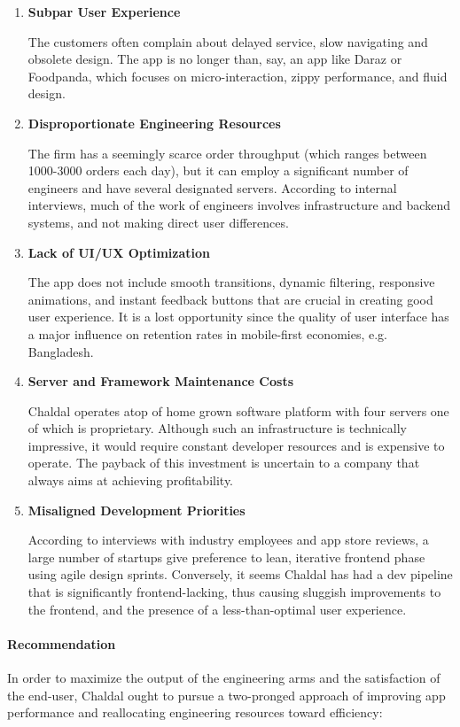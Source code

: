 \documentclass[12pt,a4paper]{article}
\begin{document}
\begin{enumerate}
    \item \textbf{Subpar User Experience}
    
 The customers often complain about delayed service, slow navigating and obsolete design. The app is no longer than, say, an app like Daraz or Foodpanda, which focuses on micro-interaction, zippy performance, and fluid design.    
    \item \textbf{Disproportionate Engineering Resources}
    
 The firm has a seemingly scarce order throughput (which ranges between 1000-3000 orders each day), but it can employ a significant number of engineers and have several designated servers. According to internal interviews, much of the work of engineers involves infrastructure and backend systems, and not making direct user differences.    
    \item \textbf{Lack of UI/UX Optimization}
    
 The app does not include smooth transitions, dynamic filtering, responsive animations, and instant feedback buttons that are crucial in creating good user experience. It is a lost opportunity since the quality of user interface has a major influence on retention rates in mobile-first economies, e.g. Bangladesh.
     \item \textbf{Server and Framework Maintenance Costs}
    
 Chaldal operates atop of home grown software platform with four servers one of which is proprietary. Although such an infrastructure is technically impressive, it would require constant developer resources and is expensive to operate. The payback of this investment is uncertain to a company that always aims at achieving profitability.
     \item \textbf{Misaligned Development Priorities}
    
 According to interviews with industry employees and app store reviews, a large number of startups give preference to lean, iterative frontend phase using agile design sprints. Conversely, it seems Chaldal has had a dev pipeline that is significantly frontend-lacking, thus causing sluggish improvements to the frontend, and the presence of a less-than-optimal user experience.
\end{enumerate}

\paragraph{Recommendation}
In order to maximize the output of the engineering arms and the satisfaction of the end-user, Chaldal ought to pursue a two-pronged approach of improving app performance and reallocating engineering resources toward efficiency:
\end{document}
